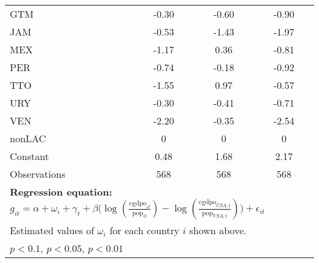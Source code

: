 \begin{table}[htbp]
\begin{tabular}{l*{3}{c}}
GTM             &    -0.30\sym{**} &    -0.60\sym{***}&    -0.90\sym{***}\\
JAM             &    -0.53\sym{***}&    -1.43\sym{***}&    -1.97\sym{***}\\
MEX             &    -1.17\sym{***}&     0.36\sym{**} &    -0.81\sym{***}\\
PER             &    -0.74\sym{***}&    -0.18         &    -0.92\sym{***}\\
TTO             &    -1.55\sym{***}&     0.97\sym{***}&    -0.57\sym{***}\\
URY             &    -0.30\sym{***}&    -0.41\sym{***}&    -0.71\sym{***}\\
VEN             &    -2.20\sym{***}&    -0.35\sym{**} &    -2.54\sym{***}\\
nonLAC          &        0         &        0         &        0         \\
Constant        &     0.48\sym{**} &     1.68\sym{***}&     2.17\sym{***}\\
\midrule
Observations    &      568         &      568         &      568         \\
\bottomrule
\multicolumn{4}{l}{\footnotesize \textbf{Regression equation:} \(g_{it} = \alpha  + \omega_i + \gamma_t + \beta \big(\log (\frac{\textrm{cgdpo}_{it}}{\textrm{pop}_{it}} ) - \log (\frac{\textrm{cgdpo}_{USA,t}}{\textrm{pop}_{USA,t}}  ) \big) + \epsilon_{it}\)}\\
\multicolumn{4}{l}{\footnotesize Estimated values of \(\omega_i\) for each country \(i\) shown above.}\\
\multicolumn{4}{l}{\footnotesize \sym{*} \(p<0.1\), \sym{**} \(p<0.05\), \sym{***} \(p<0.01\)}\\
\end{tabular}
\end{table}
